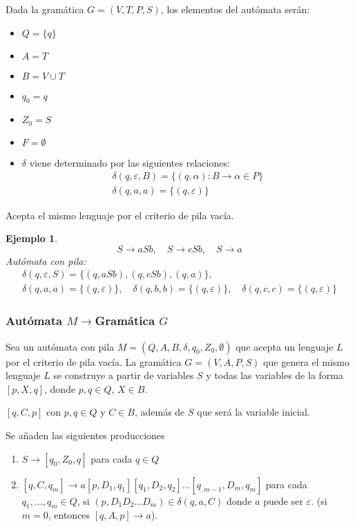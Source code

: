 \documentclass[11pt,titlepage,a4paper]{article}
\theoremstyle{ejemplo}
\newtheorem*{eje}{Ejemplo} %
\theoremstyle{algoritmo}
\begin{document}
Dada la gramática $G=(V,T,P,S)$, los elementos del autómata serán:
\begin{itemize}[noitemsep]
	\item $Q=\{q\}$
	\item $A=T$
	\item $B=V\cup T$
	\item $q_0=q$
	\item $Z_0=S$
	\item $F=\emptyset$
	\item $\delta$ viene determinado por las siguientes relaciones:
	\begin{gather*}
	\delta(q,\varepsilon,B)=\{(q,\alpha):B\to\alpha\in P\} \\
	\delta(q,a,a)=\{(q,\varepsilon)\}
	\end{gather*}
\end{itemize}
Acepta el mismo lenguaje por el criterio de pila vacía.

\begin{eje}
$$S\to aSb,\quad S\to cSb,\quad S\to a$$
Autómata con pila:
\begin{gather*}
\delta(q,\varepsilon,S)=\{(q,aSb),(q,cSb),(q,a)\}, \\
%
\delta(q,a,a)=\{(q,\varepsilon)\},\quad\delta(q,b,b)=\{(q,\varepsilon)\},\quad
\delta(q,c,c)=\{(q,\varepsilon)\}
\end{gather*}
\end{eje}

\subsubsection{Autómata $M\to$Gramática $G$}

Sea un autómata con pila $M=(Q,A,B,\delta,q_0,Z_0,\emptyset)$ que acepta un
lenguaje $L$ por el criterio de pila vacía. La gramática $G=(V,A,P,S)$ que 
genera el mismo lenguaje $L$ se construye a partir de variables $S$ y todas las 
variables de la forma $[p,X,q]$, donde $p,q\in Q$, $X\in B$.
\begin{description}[align=left,noitemsep]
	\item [Variables($V$):] $[q,C,p]$ con $p,q\in Q$ y $C\in B$, además de $S$
	que será la variable inicial.
	\item [Producciones($P$):] Se añaden las siguientes producciones
	\begin{enumerate}[noitemsep]
		\item $S\to[q_0,Z_0,q]$ para cada $q\in Q$
		\item $[q,C,q_m]\to a[p,D_1,q_1][q_1,D_2,q_2]\dots[q_{,m-1},D_m,q_m]$
		para cada $q_1,\dots,q_m\in Q$, si $(p,D_1D_2\dots D_m)\in\delta(q,a,C)$
		donde $a$ puede ser $\varepsilon$. (si $m=0$, entonces $[q,A,p]\to a$).
	\end{enumerate}
\end{description}
\end{document}
